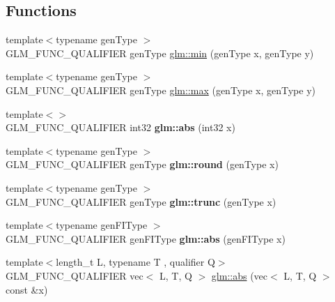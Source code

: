 \subsection*{Functions}
\begin{DoxyCompactItemize}
\item 
{\footnotesize template$<$typename gen\+Type $>$ }\\G\+L\+M\+\_\+\+F\+U\+N\+C\+\_\+\+Q\+U\+A\+L\+I\+F\+I\+ER gen\+Type \hyperlink{group__core__func__common_ga2c2bde1cec025b7ddff83c74a1113719}{glm\+::min} (gen\+Type x, gen\+Type y)
\item 
{\footnotesize template$<$typename gen\+Type $>$ }\\G\+L\+M\+\_\+\+F\+U\+N\+C\+\_\+\+Q\+U\+A\+L\+I\+F\+I\+ER gen\+Type \hyperlink{group__core__func__common_ga98caa7f95a94c86a86ebce893a45326c}{glm\+::max} (gen\+Type x, gen\+Type y)
\item 
\mbox{\label{func__common_8inl_a297722642f818493a6e4b02f4cf7781b}} 
{\footnotesize template$<$$>$ }\\G\+L\+M\+\_\+\+F\+U\+N\+C\+\_\+\+Q\+U\+A\+L\+I\+F\+I\+ER int32 {\bfseries glm\+::abs} (int32 x)
\item 
\mbox{\label{func__common_8inl_a63066719f14195375ae55b9770460301}} 
{\footnotesize template$<$typename gen\+Type $>$ }\\G\+L\+M\+\_\+\+F\+U\+N\+C\+\_\+\+Q\+U\+A\+L\+I\+F\+I\+ER gen\+Type {\bfseries glm\+::round} (gen\+Type x)
\item 
\mbox{\label{func__common_8inl_a1bd4a73a4a1f73950597df2f67c01c43}} 
{\footnotesize template$<$typename gen\+Type $>$ }\\G\+L\+M\+\_\+\+F\+U\+N\+C\+\_\+\+Q\+U\+A\+L\+I\+F\+I\+ER gen\+Type {\bfseries glm\+::trunc} (gen\+Type x)
\item 
\mbox{\label{func__common_8inl_a20ebe8867152652a4830a35894b5ab33}} 
{\footnotesize template$<$typename gen\+F\+I\+Type $>$ }\\G\+L\+M\+\_\+\+F\+U\+N\+C\+\_\+\+Q\+U\+A\+L\+I\+F\+I\+ER gen\+F\+I\+Type {\bfseries glm\+::abs} (gen\+F\+I\+Type x)
\item 
{\footnotesize template$<$length\+\_\+t L, typename T , qualifier Q$>$ }\\G\+L\+M\+\_\+\+F\+U\+N\+C\+\_\+\+Q\+U\+A\+L\+I\+F\+I\+ER vec$<$ L, T, Q $>$ \hyperlink{group__core__func__common_ga3e141c9738c73d3e581efa471dba8b4c}{glm\+::abs} (vec$<$ L, T, Q $>$ const \&x)

\end{DoxyCompactItemize}
